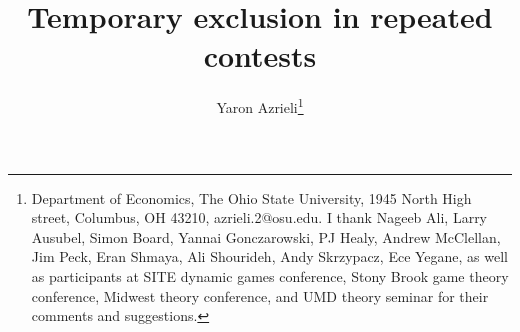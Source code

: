 \documentclass[12pt]{article}
\theoremstyle{plain}
\theoremstyle{definition}
\theoremstyle{remark}
\begin{document}

\title{Temporary exclusion in repeated contests}

\author{Yaron Azrieli\thanks{Department of Economics, The Ohio State University, 1945 North High street, Columbus, OH 43210, azrieli.2@osu.edu. I thank Nageeb Ali, Larry Ausubel, Simon Board, Yannai Gonczarowski, PJ Healy, Andrew McClellan, Jim Peck, Eran Shmaya, Ali Shourideh, Andy Skrzypacz, Ece Yegane, as well as participants at SITE dynamic games conference, Stony Brook game theory conference, Midwest theory conference, and UMD theory seminar for their comments and suggestions.}}

\maketitle


\bigskip
\bigskip
\end{document}
